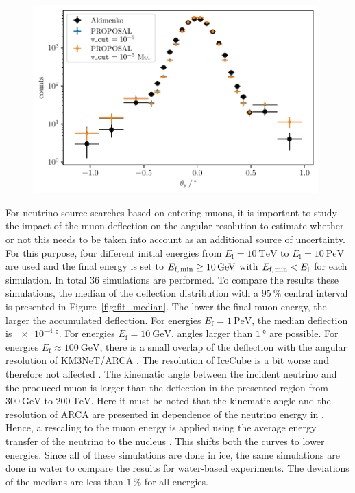 \documentclass[pdflatex, sn-mathphys]{sn-jnl}%
\theoremstyle{thmstyleone}%
\theoremstyle{thmstyletwo}%
\theoremstyle{thmstylethree}%
\begin{document}
\begin{figure}
    \centering 
    \includegraphics[width=0.98\textwidth]{../../deflection/plots/FINAL/akimenko_comparison_moliere_E7301MeV_final_multi_mean_deg.pdf}
    \caption{}
    \label{fig:akimenko_comparison}
\end{figure}


For neutrino source searches based on entering muons, it is important to study the impact of the muon 
deflection on the angular resolution to estimate whether or not this needs to be 
taken into account as an additional source of uncertainty.
For this purpose, four different initial energies 
from $E_{\text{i}} = \SI{10}{\tera\electronvolt}$ to 
$E_{\text{i}} = \SI{10}{\peta\electronvolt}$ are used and the final 
energy is set to $E_{\text{f,\,min}} \geq \SI{10}{\giga\electronvolt}$ with 
$E_{\text{f,\,min}} < E_{\text{i}}$ for each simulation. 
In total $\num{36}$ simulations are performed. 
To compare the results these simulations, the median of the deflection distribution 
with a $\SI{95}{\percent}$ central interval is presented in 
Figure~\ref{fig:fit_median}.
The lower the final muon energy, the larger the accumulated deflection. 
For energies $E_{\text{f}} = \SI{1}{\peta\electronvolt}$, the median deflection 
is $\SI{e-4}{\degree}$. For energies $E_{\text{f}} = \SI{10}{\giga\electronvolt}$, 
angles larger than $\SI{1}{\degree}$ are possible. For energies  
$E_{\text{f}} \approx \SI{100}{\giga\electronvolt}$, 
there is a small overlap of the deflection with the angular resolution of KM3NeT/ARCA 
\cite{KM3NeT_Resolution2016, KM3NeT_Resolution2021}. The resolution of IceCube is a bit worse and 
therefore not affected \cite{IceCube_Resolution2021}. 
The kinematic angle between the incident neutrino and the produced muon is 
larger than the deflection in the presented region from $\SI{300}{\giga\electronvolt}$
to $\SI{200}{\tera\electronvolt}$. Here it must be noted that the kinematic angle 
and the resolution of ARCA are presented in dependence of the neutrino energy 
in \cite{KM3NeT_Resolution2016, KM3NeT_Resolution2021}. Hence, a rescaling to the muon energy is applied using the average energy transfer of the neutrino to 
the nucleus \cite{GANDHI199681}. This shifts both the curves to lower energies. 
Since all of these simulations are done 
in ice, the same simulations are done in water to compare the results for 
water-based experiments. The deviations of the medians
are less than $\SI{1}{\percent}$ for all energies.
\end{document}
